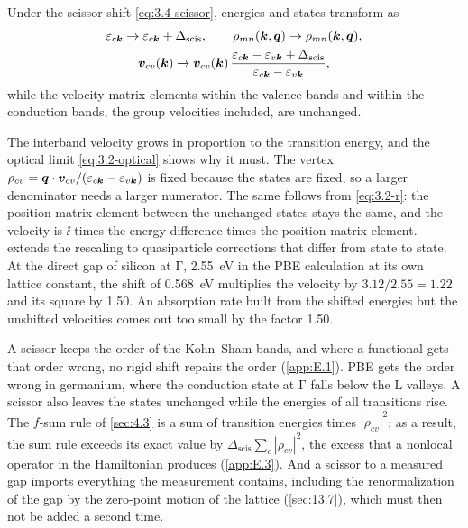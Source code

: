 \begin{keyresult}
Under the scissor shift \cref{eq:3.4-scissor}, energies and states transform as
\begin{equation}
  \begin{gathered}
  \varepsilon_{c\bm{k}} \to \varepsilon_{c\bm{k}} + \Delta_{\mathrm{scis}}, \qquad \rho_{mn}(\bm{k}, \bm{q}) \to \rho_{mn}(\bm{k}, \bm{q}), \\
  \bm{v}_{cv}(\bm{k}) \to \bm{v}_{cv}(\bm{k})\,\frac{\varepsilon_{c\bm{k}} - \varepsilon_{v\bm{k}} + \Delta_{\mathrm{scis}}}{\varepsilon_{c\bm{k}} - \varepsilon_{v\bm{k}}} ,
  \end{gathered}
  \label{eq:3.4-vscis}
\end{equation}
while the velocity matrix elements within the valence bands and within the conduction bands, the group velocities included, are unchanged.
\end{keyresult}
The interband velocity grows in proportion to the transition energy, and the optical limit \cref{eq:3.2-optical} shows why it must. The vertex $\rho_{cv} = \bm{q}\cdot\bm{v}_{cv}/(\varepsilon_{c\bm{k}} - \varepsilon_{v\bm{k}})$ is fixed because the states are fixed, so a larger denominator needs a larger numerator. The same follows from \cref{eq:3.2-r}: the position matrix element between the unchanged states stays the same, and the velocity is $\ii$ times the energy difference times the position matrix element.  extends the rescaling to quasiparticle corrections that differ from state to state. At the direct gap of silicon at $\mathrm{\Gamma}$, \SI{2.55}{eV} in the PBE calculation at its own lattice constant, the shift of \SI{0.568}{eV} multiplies the velocity by $3.12/2.55 = 1.22$ and its square by 1.50. An absorption rate built from the shifted energies but the unshifted velocities comes out too small by the factor 1.50.

A scissor keeps the order of the Kohn--Sham bands, and where a functional gets that order wrong, no rigid shift repairs the order (\cref{app:E.1}). PBE gets the order wrong in germanium, where the conduction state at $\mathrm{\Gamma}$ falls below the $\mathrm{L}$ valleys. A scissor also leaves the states unchanged while the energies of all transitions rise. The $f$-sum rule of \cref{sec:4.3} is a sum of transition energies times $|\rho_{cv}|^2$; as a result, the sum rule exceeds its exact value by $\Delta_{\mathrm{scis}}\sum_c|\rho_{cv}|^2$, the excess that a nonlocal operator in the Hamiltonian produces (\cref{app:E.3}). And a scissor to a measured gap imports everything the measurement contains, including the renormalization of the gap by the zero-point motion of the lattice (\cref{sec:13.7}), which must then not be added a second time.

